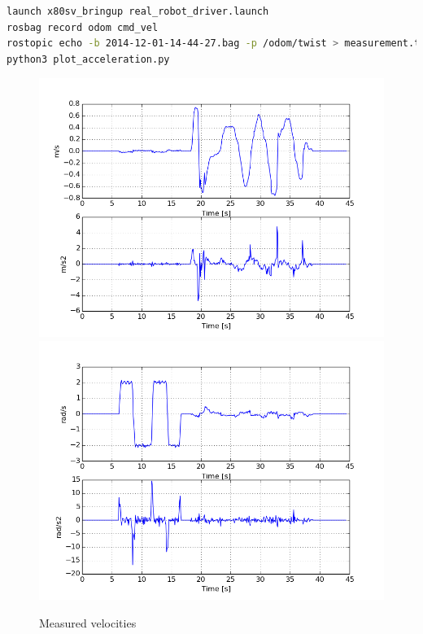 \documentclass[a4paper]{article}
\begin{document}
\begin{lstlisting}[language=bash,caption={commands to determine robot limitations},
    label=lst:robotlimits]
launch x80sv_bringup real_robot_driver.launch
rosbag record odom cmd_vel
rostopic echo -b 2014-12-01-14-44-27.bag -p /odom/twist > measurement.txt
python3 plot_acceleration.py
\end{lstlisting}


\begin{figure}[h!]
  \centering
  \includegraphics[width=\textwidth,height=\textheight,keepaspectratio]{img/v.png}
  \includegraphics[width=\textwidth,height=\textheight,keepaspectratio]{img/omega.png}
  \caption{Measured velocities}
  \label{fig:robotlimits}
\end{figure}
\end{document}
